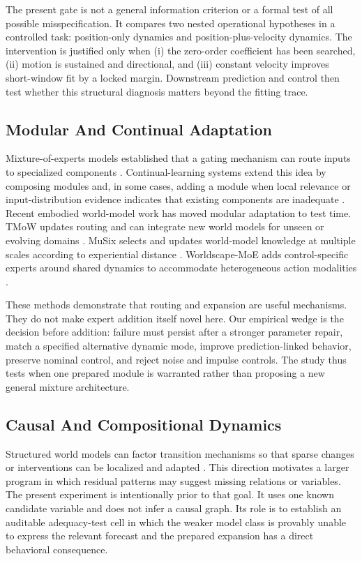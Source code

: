 \documentclass[10pt]{article}
\begin{document}
The present gate is not a general information criterion or a formal test of all possible misspecification. It compares two nested operational hypotheses in a controlled task: position-only dynamics and position-plus-velocity dynamics. The intervention is justified only when (i) the zero-order coefficient has been searched, (ii) motion is sustained and directional, and (iii) constant velocity improves short-window fit by a locked margin. Downstream prediction and control then test whether this structural diagnosis matters beyond the fitting trace.

\subsection{Modular And Continual Adaptation}

Mixture-of-experts models established that a gating mechanism can route inputs to specialized components \cite{jacobs1991experts}. Continual-learning systems extend this idea by composing modules and, in some cases, adding a module when local relevance or input-distribution evidence indicates that existing components are inadequate \cite{ostapenko2021lmc}. Recent embodied world-model work has moved modular adaptation to test time. TMoW updates routing and can integrate new world models for unseen or evolving domains \cite{jang2026tmow}. MuSix selects and updates world-model knowledge at multiple scales according to experiential distance \cite{jang2026musix}. Worldscape-MoE adds control-specific experts around shared dynamics to accommodate heterogeneous action modalities \cite{fang2026worldscape}.

These methods demonstrate that routing and expansion are useful mechanisms. They do not make expert addition itself novel here. Our empirical wedge is the decision before addition: failure must persist after a stronger parameter repair, match a specified alternative dynamic mode, improve prediction-linked behavior, preserve nominal control, and reject noise and impulse controls. The study thus tests when one prepared module is warranted rather than proposing a new general mixture architecture.

\subsection{Causal And Compositional Dynamics}

Structured world models can factor transition mechanisms so that sparse changes or interventions can be localized and adapted \cite{lei2023vcd}. This direction motivates a larger program in which residual patterns may suggest missing relations or variables. The present experiment is intentionally prior to that goal. It uses one known candidate variable and does not infer a causal graph. Its role is to establish an auditable adequacy-test cell in which the weaker model class is provably unable to express the relevant forecast and the prepared expansion has a direct behavioral consequence.
\end{document}
